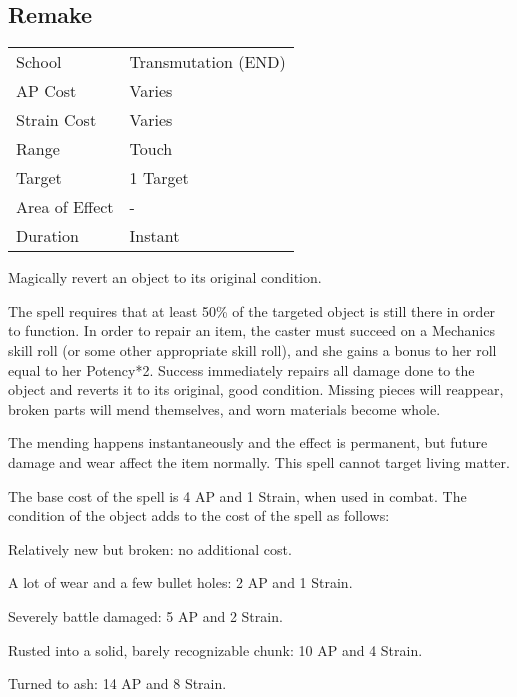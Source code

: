 \documentclass[11pt,a4paper,twocolumn]{book}
\begin{document}
\vfill

\subsection*{Remake}
{
	\begin{tabu} to 75mm{| X[l,4] | X[l,7] |}
		\hline
		School 			& Transmutation (END) 	\\
		AP Cost	      	& Varies 				\\
		Strain Cost     & Varies 				\\
		Range     		& Touch					\\
		Target      	& 1 Target				\\
		Area of Effect  & -  	 				\\
		Duration     	& Instant				\\ \hline
	\end{tabu}
	
}

\medskip

Magically revert an object to its original condition.

The spell requires that at least 50\% of the targeted object is still there in order to function. In order to repair an item, the caster must succeed on a Mechanics skill roll (or some other appropriate skill roll), and she gains a bonus to her roll equal to her Potency*2. Success immediately repairs all damage done to the object and reverts it to its original, good condition. Missing pieces will reappear, broken parts will mend themselves, and worn materials become whole.

The mending happens instantaneously and the effect is permanent, but future damage and wear affect the item normally. This spell cannot target living matter.

The base cost of the spell is 4 AP and 1 Strain, when used in combat. The condition of the object adds to the cost of the spell as follows:
\medskip
\begin{compactitem}
	\item Relatively new but broken: no additional cost.
	\item A lot of wear and a few bullet holes: 2 AP and 1 Strain.
	\item Severely battle damaged: 5 AP and 2 Strain.
	\item Rusted into a solid, barely recognizable chunk: 10 AP and 4 Strain.
	\item Turned to ash: 14 AP and 8 Strain.
\end{compactitem}
\end{document}
